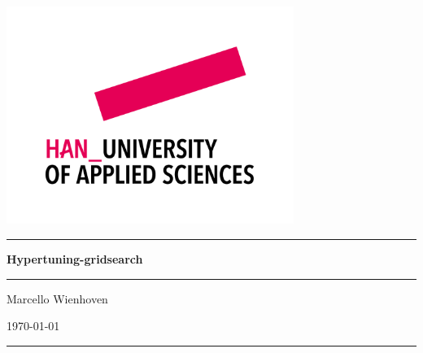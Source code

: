 \documentclass[11pt, twoside]{article}
\numberwithin{equation}{section}
\renewcommand{\baselinestretch}{1}\normalsize
\begin{document}
\thispagestyle{empty}  %
\pagestyle{fancy}      %

\renewcommand{\baselinestretch}{1}\normalsize

\fancyhf{}  %
\renewcommand{\footrulewidth}{1.1pt}  %
\renewcommand{\headrulewidth}{0pt}    %
\fancyfoot[LE]{\thepage}  %
\fancyfoot[RO]{\thepage}  %
\fancyfoot[LO]{\leftmark}   %
\fancyfoot[RE]{\leftmark}   %

\begin{titlepage}
    \centering
    \includegraphics[width=0.7\textwidth]{HAN-merkteken-descriptor.png}
    \vspace{1cm} %
    \hrule
    \vspace{0.5cm}
    {\Huge \bfseries Hypertuning-gridsearch \par}
    \vspace{0.5cm}
    \hrule
    \vspace{0.5cm}
    {\LARGE Marcello Wienhoven \par}
    \vspace{0.5cm}
    {\LARGE \today \par}
    \vspace{0.5cm}
    \hrule
    
\end{titlepage}
\end{document}
